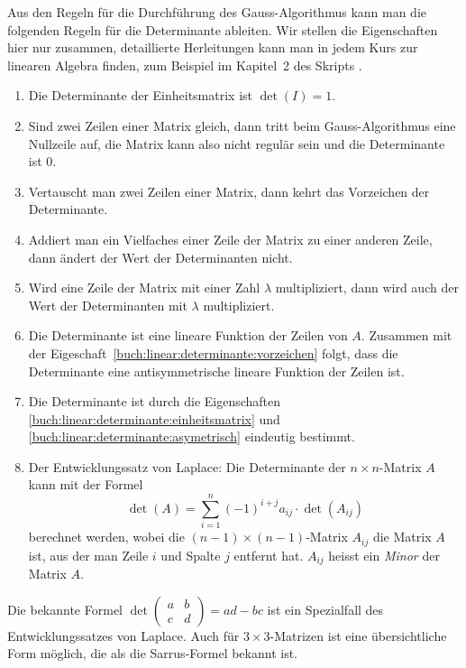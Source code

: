 Aus den Regeln für die Durchführung des Gauss-Algorithmus kann man die
folgenden Regeln für die Determinante ableiten.
Wir stellen die Eigenschaften hier nur zusammen, detaillierte Herleitungen
kann man in jedem Kurs zur linearen Algebra finden, zum Beispiel im
Kapitel~2 des Skripts \cite{buch:linalg}.
\begin{enumerate}
\item
\label{buch:linear:determinante:einheitsmatrix}
Die Determinante der Einheitsmatrix ist $\det(I)=1$.
\item
Sind zwei Zeilen einer Matrix gleich, dann tritt beim Gauss-Algorithmus
eine Nullzeile auf, die Matrix kann also nicht regulär sein und die
Determinante ist $0$.
\item
\label{buch:linear:determinante:vorzeichen}
Vertauscht man zwei Zeilen einer Matrix, dann kehrt das Vorzeichen der
Determinante.
\item
Addiert man ein Vielfaches einer Zeile der Matrix zu einer anderen Zeile,
dann ändert der Wert der Determinanten nicht.
\item
Wird eine Zeile der Matrix mit einer Zahl $\lambda$ multipliziert, dann
wird auch der Wert der Determinanten mit $\lambda$ multipliziert.
\item
\label{buch:linear:determinante:asymetrisch}
Die Determinante ist eine lineare Funktion der Zeilen von $A$.
Zusammen mit der Eigeschaft~\ref{buch:linear:determinante:vorzeichen}
folgt, dass die Determinante eine antisymmetrische lineare Funktion
der Zeilen ist.
\item
Die Determinante ist durch die Eigenschaften
\ref{buch:linear:determinante:einheitsmatrix}
und
\ref{buch:linear:determinante:asymetrisch}
eindeutig bestimmt.
\item
Der Entwicklungssatz von Laplace:
%
Die Determinante der $n\times n$-Matrix $A$ kann mit der Formel
\begin{equation}
\det(A)
=
\sum_{i=1}^n (-1)^{i+j} a_{i\!j} \cdot \det(A_{i\!j})
\end{equation}
berechnet werden,
wobei die $(n-1)\times(n-1)$-Matrix $A_{i\!j}$ die Matrix $A$ ist, aus der
man Zeile $i$ und Spalte $j$ entfernt hat.
$A_{i\!j}$ heisst ein {\em Minor} der Matrix $A$.
\label{buch:linear:def:minor}
%
\end{enumerate}

Die bekannte Formel $\det\begin{pmatrix}a&b\\c&d\end{pmatrix}=ad-bc$
ist ein Spezialfall des Entwicklungssatzes von Laplace.
Auch für $3\times 3$-Matrizen ist eine übersichtliche Form möglich,
die als die Sarrus-Formel bekannt ist.
%

